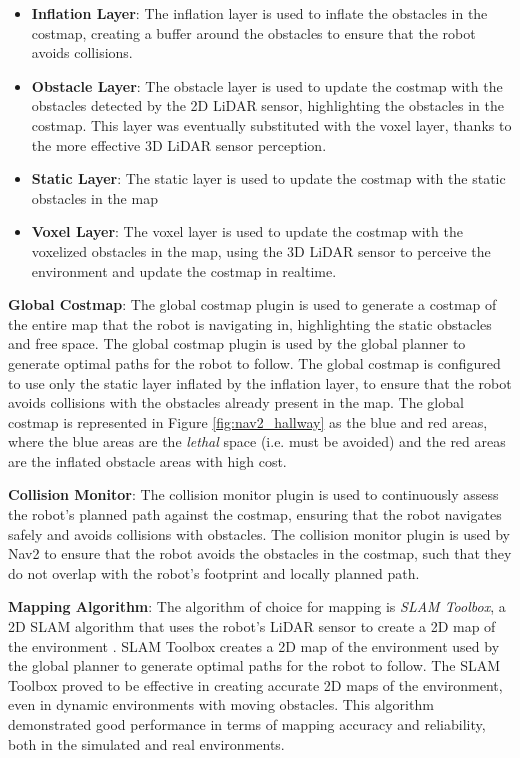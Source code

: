 \begin{itemize}
    \item \textbf{Inflation Layer}: The inflation layer is used to inflate the obstacles in the costmap, creating a buffer
    around the obstacles to ensure that the robot avoids collisions.
    \item \textbf{Obstacle Layer}: The obstacle layer is used to update the costmap with the obstacles detected by
    the 2D LiDAR sensor, highlighting the obstacles in the costmap. This layer was eventually substituted with the voxel layer,
    thanks to the more effective 3D LiDAR sensor perception.
    \item \textbf{Static Layer}: The static layer is used to update the costmap with the static obstacles in the map
    \item \textbf{Voxel Layer}: The voxel layer is used to update the costmap with the voxelized obstacles in the map,
    using the 3D LiDAR sensor to perceive the environment and update the costmap in realtime.
\end{itemize}

\textbf{Global Costmap}:
The global costmap plugin is used to generate a costmap of the entire map that the robot is navigating in, highlighting
the static obstacles and free space. The global costmap plugin is used by the global planner to generate optimal paths
for the robot to follow. The global costmap is configured to use only the static layer inflated by the inflation layer,
to ensure that the robot avoids collisions with the obstacles already present in the map.
The global costmap is represented in Figure \ref{fig:nav2_hallway} as the blue and red areas, where the blue areas are the 
\textit{lethal} space (i.e. must be avoided) and the red areas are the inflated obstacle areas with high cost.

\textbf{Collision Monitor}:
The collision monitor plugin is used to continuously assess the robot's planned path against the costmap, ensuring
that the robot navigates safely and avoids collisions with obstacles. The collision monitor plugin is used by
Nav2 to ensure that the robot avoids the obstacles in the costmap, such that they do not overlap with the robot's
footprint and locally planned path.

\textbf{Mapping Algorithm}:
The algorithm of choice for mapping is \textit{SLAM Toolbox}, a 2D SLAM algorithm
that uses the robot's LiDAR sensor to create a 2D map of the environment \cite{Macenski2021slamtoolbox}.
SLAM Toolbox creates a 2D map of the environment used by the global planner to generate optimal paths for the robot to follow.
The SLAM Toolbox proved to be effective in creating accurate 2D maps of the environment, even in dynamic environments
with moving obstacles. This algorithm demonstrated good performance in terms of mapping accuracy and reliability,
both in the simulated and real environments.

